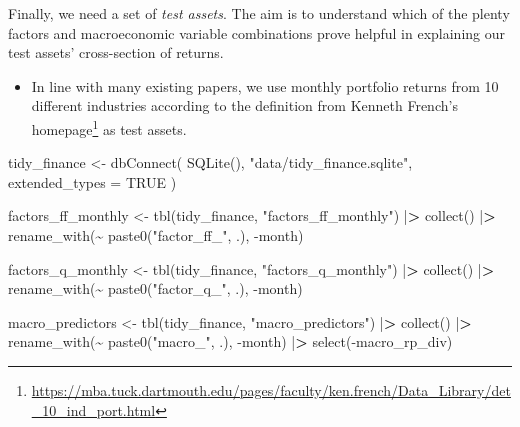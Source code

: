 \documentclass[
]{book}
\newenvironment{Shaded}{\begin{snugshade}}{\end{snugshade}}
\newcommand{\AttributeTok}[1]{\textcolor[rgb]{0.61,0.61,0.61}{#1}}
\newcommand{\ConstantTok}[1]{\textcolor[rgb]{0,0,0}{#1}}
\newcommand{\ErrorTok}[1]{\textcolor[rgb]{0.14,0.14,0.14}{\textbf{#1}}}
\newcommand{\FunctionTok}[1]{\textcolor[rgb]{0,0,0}{#1}}
\newcommand{\NormalTok}[1]{#1}
\newcommand{\OtherTok}[1]{\textcolor[rgb]{0.37,0.37,0.37}{#1}}
\newcommand{\SpecialCharTok}[1]{\textcolor[rgb]{0,0,0}{#1}}
\newcommand{\StringTok}[1]{\textcolor[rgb]{0.5,0.5,0.5}{#1}}
\providecommand{\tightlist}{%
  \setlength{\itemsep}{0pt}\setlength{\parskip}{0pt}}
\renewcommand{\href}[2]{#2\footnote{\url{#1}}}
\begin{document}
Finally, we need a set of \emph{test assets}. The aim is to understand which of the plenty factors and macroeconomic variable combinations prove helpful in explaining our test assets' cross-section of returns.

\begin{itemize}
\tightlist
\item
  In line with many existing papers, we use monthly portfolio returns from 10 different industries according to the definition from \href{https://mba.tuck.dartmouth.edu/pages/faculty/ken.french/Data_Library/det_10_ind_port.html}{Kenneth French's homepage} as test assets.
\end{itemize}

\begin{Shaded}
\begin{Highlighting}[]
\NormalTok{tidy\_finance }\OtherTok{\textless{}{-}} \FunctionTok{dbConnect}\NormalTok{(}
  \FunctionTok{SQLite}\NormalTok{(), }\StringTok{"data/tidy\_finance.sqlite"}\NormalTok{, }\AttributeTok{extended\_types =} \ConstantTok{TRUE}
\NormalTok{)}

\NormalTok{factors\_ff\_monthly }\OtherTok{\textless{}{-}} \FunctionTok{tbl}\NormalTok{(tidy\_finance, }\StringTok{"factors\_ff\_monthly"}\NormalTok{) }\SpecialCharTok{|}\ErrorTok{\textgreater{}}
  \FunctionTok{collect}\NormalTok{() }\SpecialCharTok{|}\ErrorTok{\textgreater{}}
  \FunctionTok{rename\_with}\NormalTok{(}\SpecialCharTok{\textasciitilde{}} \FunctionTok{paste0}\NormalTok{(}\StringTok{"factor\_ff\_"}\NormalTok{, .), }\SpecialCharTok{{-}}\NormalTok{month)}

\NormalTok{factors\_q\_monthly }\OtherTok{\textless{}{-}} \FunctionTok{tbl}\NormalTok{(tidy\_finance, }\StringTok{"factors\_q\_monthly"}\NormalTok{) }\SpecialCharTok{|}\ErrorTok{\textgreater{}}
  \FunctionTok{collect}\NormalTok{() }\SpecialCharTok{|}\ErrorTok{\textgreater{}}
  \FunctionTok{rename\_with}\NormalTok{(}\SpecialCharTok{\textasciitilde{}} \FunctionTok{paste0}\NormalTok{(}\StringTok{"factor\_q\_"}\NormalTok{, .), }\SpecialCharTok{{-}}\NormalTok{month)}

\NormalTok{macro\_predictors }\OtherTok{\textless{}{-}} \FunctionTok{tbl}\NormalTok{(tidy\_finance, }\StringTok{"macro\_predictors"}\NormalTok{) }\SpecialCharTok{|}\ErrorTok{\textgreater{}}
  \FunctionTok{collect}\NormalTok{() }\SpecialCharTok{|}\ErrorTok{\textgreater{}}
  \FunctionTok{rename\_with}\NormalTok{(}\SpecialCharTok{\textasciitilde{}} \FunctionTok{paste0}\NormalTok{(}\StringTok{"macro\_"}\NormalTok{, .), }\SpecialCharTok{{-}}\NormalTok{month) }\SpecialCharTok{|}\ErrorTok{\textgreater{}}
  \FunctionTok{select}\NormalTok{(}\SpecialCharTok{{-}}\NormalTok{macro\_rp\_div)}


\end{Highlighting}
\end{Shaded}
\end{document}
